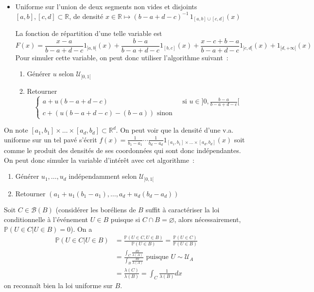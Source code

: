 \begin{itemize}
\item
  Uniforme sur l'union de deux segments non vides et disjoints
  \([a,b], [c,d]\subset\mathbb{R}\), de densité
  \(x\in\mathbb{R}\mapsto (b-a + d-c)^{-1}\,1_{[a,b]\cup[c,d]}(x)\)

  La fonction de répartition d'une telle variable est
  \[F(x) = \frac{x-a}{b-a + d-c} 1_{]a,b[}(x) + \frac{b-a}{b-a + d-c} 1_{[b,c]}(x) + \frac{x-c+b-a}{b-a + d-c} 1_{]c,d[}(x) + 1_{[d,+\infty[}(x)\]
  Pour simuler cette variable, on peut donc utiliser l'algorithme
  suivant~:

  \begin{enumerate}
  \def\labelenumi{\arabic{enumi}.}
  \tightlist
  \item
    Générer \(u\) selon \(\mathcal{U}_{]0,1[}\)
  \item
    Retourner \[\begin{cases} 
      a + u(b-a + d -c) & \text{ si } u \in ]0,\frac{b-a}{b-a + d-c}[ \\
      c + (u(b-a + d -c) - (b-a)) \text{ sinon }
      \end{cases}\]
  \end{enumerate}
\end{itemize}

\label{V-answer-unipave}
On note \([a_1,b_1]\times\dots\times[a_d,b_d] \subset \mathbb{R}^d\). On
peut voir que la densité d'une v.a. uniforme sur un tel pavé s'écrit
\(f(x) = \frac{1}{b_1 - a_1} \cdots \frac{1}{b_d - a_d} 1_{[a_1,b_1]\times\dots\times[a_d,b_d]}(x)\)
soit comme le produit des densités de ses coordonnées qui sont donc
indépendantes. On peut donc simuler la variable d'intérêt avec cet
algorithme~:

\begin{enumerate}
\def\labelenumi{\arabic{enumi}.}
\tightlist
\item
  Générer \(u_1,\ldots,u_d\) indépendamment selon
  \(\mathcal{U}_{]0,1[}\)
\item
  Retourner \((a_1 + u_1(b_1-a_1), \ldots, a_d + u_d(b_d-a_d))\)
\end{enumerate}

\label{V-answer-unicond}
Soit \(C \in \mathcal{B}(B)\) (considérer les boréliens de \(B\) suffit
à caractériser la loi conditionnelle à l'événement \(U \in B\) puisque
si \(C \cap B = \varnothing\), alors nécessairement,
\(\mathbb{P}(U \in C |U \in B) = 0\)). On a \begin{align*}
\mathbb{P}(U \in C |U \in B) & = \frac{\mathbb{P}(U\in C, U \in B)}{\mathbb{P}(U \in B)} = \frac{\mathbb{P}(U\in C)}{\mathbb{P}(U \in B)} \\
& = \frac{\int_C \frac{dx}{\lambda(A)}}{\int_B \frac{dx}{\lambda(A)}} \text{ puisque } U \sim \mathcal{U}_A \\
& = \frac{\lambda(C)}{\lambda(B)} = \int_C \frac{1}{\lambda(B)} dx
\end{align*} on reconnaît bien la loi uniforme sur \(B\).

